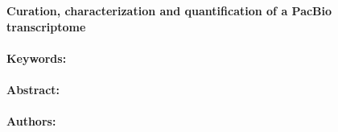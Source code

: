 \noindent
\large {\bf Curation, characterization and quantification of a PacBio transcriptome} 


\normalsize 


\noindent \paragraph{Keywords:} 

\noindent \paragraph{Abstract:} 



\noindent \paragraph{Authors:} 

